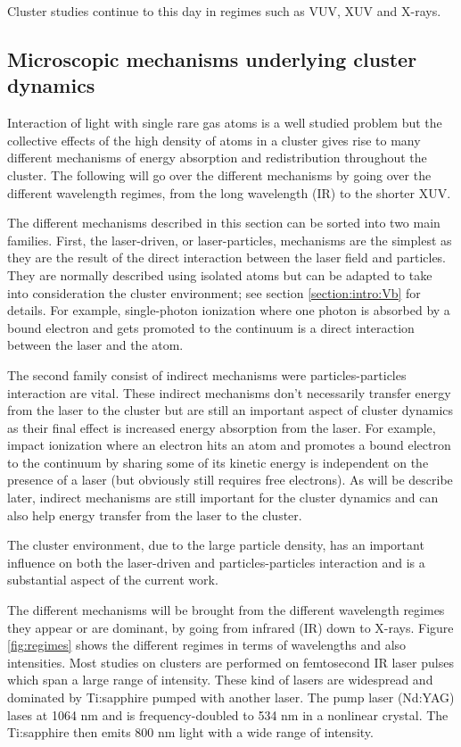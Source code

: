 Cluster studies continue to this day in regimes such as VUV\cite{Arbeiter2011},
XUV\cite{Murphy2008a,Murphy2008b,Krikunova2012} and X-rays\cite{Ziaja2009b}.




\subsection{Microscopic mechanisms underlying cluster dynamics}
\label{section:intro:mechanisms}

Interaction of light with single rare gas atoms is a well studied problem but
the collective effects of the high density of atoms in a cluster gives rise to
many different mechanisms of energy absorption and redistribution throughout the
cluster. The following will go over the different mechanisms by going over the
different wavelength regimes, from the long wavelength (IR) to the shorter XUV.

The different mechanisms described in this section can be sorted into two main
families. First, the laser-driven, or laser-particles, mechanisms are the
simplest as they are the result of the direct interaction between the laser
field and particles. They are normally described using isolated atoms but can
be adapted to take into consideration the cluster environment; see section
\ref{section:intro:Vb} for details. For example, single-photon ionization where
one photon is absorbed by a bound electron and gets promoted to the continuum is
a direct interaction between the laser and the atom.

The second family consist of indirect mechanisms were particles-particles
interaction are vital. These indirect mechanisms don't necessarily transfer
energy from the laser to the cluster but are still an important aspect of
cluster dynamics as their final effect is increased energy absorption from the
laser. For example, impact ionization where
an electron hits an atom and promotes a bound electron to the continuum by
sharing some of its kinetic energy is independent on the presence of a laser
(but obviously still requires free electrons). As will be describe later,
indirect mechanisms are still important for the cluster dynamics and can also
help energy transfer from the laser to the cluster.

The cluster environment, due to the large particle density, has an important
influence on both the laser-driven and particles-particles interaction and is
a substantial aspect of the current work.

The different mechanisms will be brought from the different wavelength regimes
they appear or are dominant, by going from infrared (IR) down to X-rays. Figure
\ref{fig:regimes} shows the different regimes in terms of wavelengths and also
intensities. Most studies on clusters are performed on femtosecond IR laser
pulses which span a large range of intensity. These kind of lasers are
widespread and dominated by Ti:sapphire pumped with another laser. The pump
laser (Nd:YAG) lases at 1064 nm and is frequency-doubled to 534 nm in a
nonlinear crystal. The Ti:sapphire then emits 800 nm light with a wide range of
intensity.

